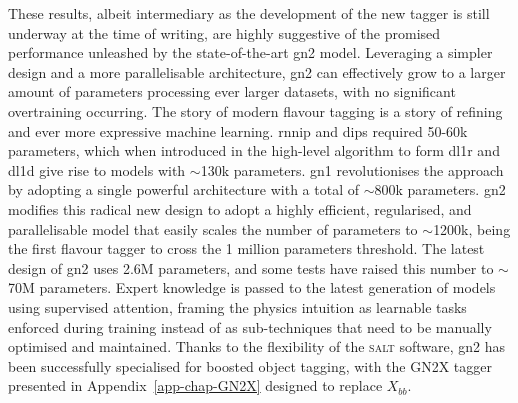 These results, albeit intermediary as the development of the new tagger is still underway at the time of writing, are highly suggestive of the promised performance unleashed by the state-of-the-art \gls{gn2} model. Leveraging a simpler design and a more parallelisable architecture, \gls{gn2} can effectively grow to a larger amount of parameters processing ever larger datasets, with no significant overtraining occurring. The story of modern flavour tagging is a story of refining and ever more expressive machine learning. \gls{rnnip} and \gls{dips} required 50-60k parameters, which when introduced in the high-level algorithm to form \gls{dl1r} and \gls{dl1d} give rise to models with $\sim$130k parameters. \gls{gn1} revolutionises the approach by adopting a single powerful architecture with a total of $\sim$800k parameters. \gls{gn2} modifies this radical new design to adopt a highly efficient, regularised, and parallelisable model that easily scales the number of parameters to $\sim$1200k, being the first flavour tagger to cross the 1 million parameters threshold. The latest design of \gls{gn2} uses 2.6M parameters, and some tests have raised this number to $\sim$70M parameters. Expert knowledge is passed to the latest generation of models using supervised attention, framing the physics intuition as learnable tasks enforced during training instead of as sub-techniques that need to be manually optimised and maintained. Thanks to the flexibility of the \textsc{salt} software, \gls{gn2} has been successfully specialised for boosted object tagging, with the GN2X tagger presented in Appendix~\ref{app-chap-GN2X} designed to replace $X_{bb}$.
